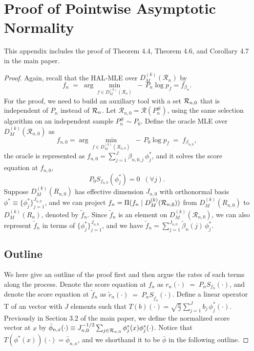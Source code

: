 \section{Proof of Pointwise Asymptotic Normality} \label{appendix_D: proof of asymptotic normality}

This appendix includes the proof of Theorem 4.4, Theorem 4.6, and Corollary 4.7 in the main paper.

\begin{proof}
Again, recall that the HAL‐MLE over $D^{(k)}_M(\mathcal R_n)$ by
\[
f_n \;=\;\arg\min_{f\in D^{(k)}_M(\mathcal R_n)}\;-\,P_n\log p_f = f_{\beta_n}.
\]
For the proof, we need to build an auxiliary tool with a set ${\cal R}_{n,0}$ that is independent of $P_n$ instead of ${\cal R}_n$. Let \(\mathcal R_{n,0} = \mathcal R(P_n^{\#})\), using the same selection algorithm on an independent sample \(P_n^{\#}\sim P_0\).
Define the oracle MLE over $D^{(k)}_M(\mathcal R_{n,0})$ as
\[f_{n,0}=\arg\min_{f\in D^{(k)}_M(\mathcal R_{n,0})}\;-\,P_0\log p_f \;=\;f_{\beta_{n,0}},\] the oracle is represented as $f_{n,0}=\sum_{j=1}^{J}\beta_{n,0,j}\,\phi_j^{\ast}$, and it solves the score equation at $f_{n,0}$, \[P_0 S_{f_{n,0}}(\phi_j^{\ast}) = 0\;\;(\forall j).\]
Suppose \(D^{(k)}_M(R_{n,0})\) has effective dimension \(J_{n,0}\) with orthonormal basis
\(\phi^* \equiv \{\phi_j^{\ast}\}_{j=1}^{J_{n,0}}\), and we can project $f_n =  \Pi(f_n\mid D^{(k)}_M({\cal R}_{n,0}))$ from \(D^{(k)}_M(R_{n,0})\) to \(D^{(k)}_M(R_{n})\), denoted by $\tilde f_n$. Since $\tilde f_n$ is an element on $D^{(k)}_M(\mathcal R_{n,0})$, we can also represent $\tilde f_n $ in terms of \(\{\phi_j^{\ast}\}_{j=1}^{J_{n,0}}\), and we have $\tilde f_n = \sum_{j=1}^{J_{n,0}}\tilde \beta_{n}(j)\,\phi_j^{\ast}$. 

\subsection{Outline}
We here give an outline of the proof first and then argue the rates of each terms along the process. Denote the score equation at $f_n$ as $r_n(\cdot) \;=\; P_n S_{f_n}(\cdot)$, and denote the score equation at $\tilde f_n$ as $\tilde r_n(\cdot) \;=\; P_n S_{\tilde f_n}(\cdot)$. Define a linear operator T of an vector with $J$ elements such that \(T(b)(\cdot)=\sqrt{\frac{n}{J}}\sum_{j=1}^{J} b_j\,\phi_j^{\ast}(\cdot)\). Previously in Section 3.2 of the main paper, we define the normalized score vector at \(x\) by
\(
\bar{\phi}_{n,x}(\cdot)\equiv J_{n,0}^{-1/2}\sum_{j\in {\cal R}_{n,0}}\phi_j^*(x)\phi_j^*(\cdot)\).
Notice that $T(\phi^*(x))(\cdot) = \bar\phi_{n,x}$, and we shorthand it to be $\bar\phi$ in the following outline.





\end{proof}
